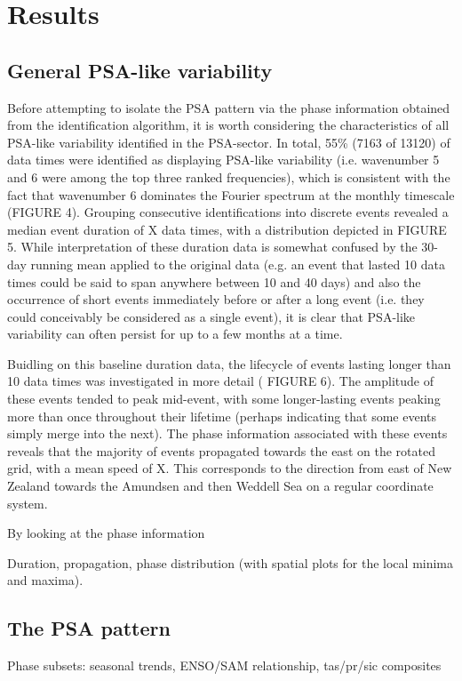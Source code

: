 \section{Results}

\subsection{General PSA-like variability}

Before attempting to isolate the PSA pattern via the phase information obtained from the identification algorithm, it is worth considering the characteristics of all PSA-like variability identified in the PSA-sector. In total, 55\% (7163 of 13120) of data times were identified as displaying PSA-like variability (i.e. wavenumber 5 and 6 were among the top three ranked frequencies), which is consistent with the fact that wavenumber 6 dominates the Fourier spectrum at the monthly timescale (FIGURE 4). Grouping consecutive identifications into discrete events revealed a median event duration of X data times, with a distribution depicted in FIGURE 5. While interpretation of these duration data is somewhat confused by the 30-day running mean applied to the original data (e.g. an event that lasted 10 data times could be said to span anywhere between 10 and 40 days) and also the occurrence of short events immediately before or after a long event (i.e. they could conceivably be considered as a single event), it is clear that PSA-like variability can often persist for up to a few months at a time.     

Buidling on this baseline duration data, the lifecycle of events lasting longer than 10 data times was investigated in more detail ( FIGURE 6). The amplitude of these events tended to peak mid-event, with some longer-lasting events peaking more than once throughout their lifetime (perhaps indicating that some events simply merge into the next). The phase information associated with these events reveals that the majority of events propagated towards the east on the rotated grid, with a mean speed of X. This corresponds to the direction from east of New Zealand towards the Amundsen and then Weddell Sea on a regular coordinate system. 

By looking at the phase information 


Duration, propagation, phase distribution (with spatial plots for the local minima and maxima).

\subsection{The PSA pattern}

Phase subsets: seasonal trends, ENSO/SAM relationship, tas/pr/sic composites







